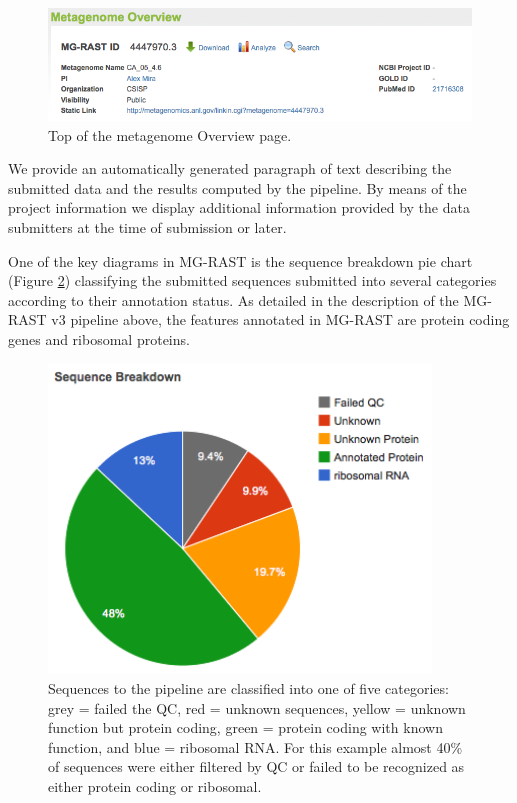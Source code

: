 \documentclass[12pt,fullpage]{report}
\begin{document}
\begin{figure}
\begin{center}
\includegraphics[width=6in]{Images/metagenome-overview.png}
\end{center}
\caption{
Top of the metagenome Overview page.
}
\label{fig:metagenome-overview}
\end{figure}

We provide an automatically generated paragraph of text describing the submitted data and the results computed by the pipeline. By means of the project information we display additional information provided by the data submitters at the time of submission or later.

One of the key diagrams in MG-RAST is the sequence breakdown pie chart (Figure \ref{fig:classification-pie-chart}) classifying the submitted sequences submitted into several categories according to their annotation status. As detailed in the description of the MG-RAST v3 pipeline above, the features annotated in MG-RAST are protein coding genes and ribosomal proteins.

\begin{figure}
\begin{center}
\includegraphics[width=4in]{Images/classification-pie-chart.png}
\end{center}
\caption{
Sequences to the pipeline are classified into one of five categories: grey = failed the QC, red = unknown sequences, yellow = unknown function but protein coding, green = protein coding with known function, and blue = ribosomal RNA. For this example almost 40\% of sequences were either filtered by QC or failed to be recognized as either protein coding or ribosomal.
}
\label{fig:classification-pie-chart}
\end{figure}
\end{document}
